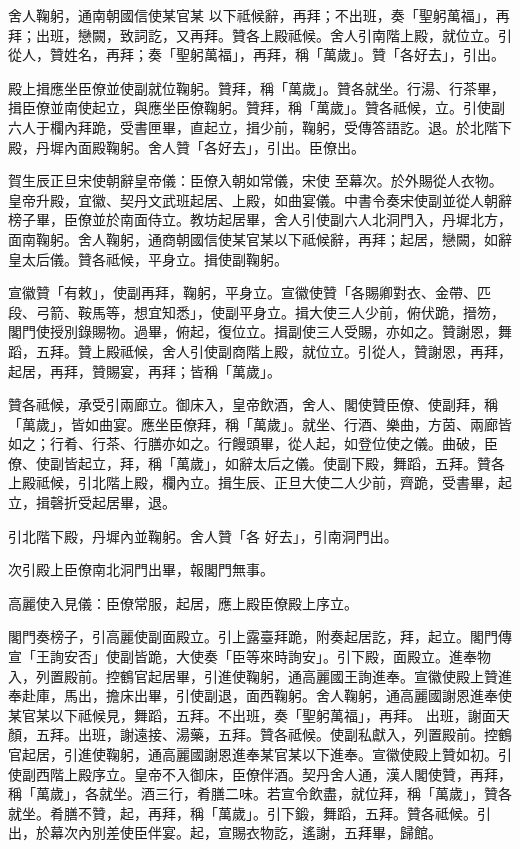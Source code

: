 \begin{pinyinscope}
 舍人鞠躬，通南朝國信使某官某
 以下祗候辭，再拜；不出班，奏「聖躬萬福」，再拜；出班，戀闕，致詞訖，又再拜。贊各上殿祗候。舍人引南階上殿，就位立。引從人，贊姓名，再拜；奏「聖躬萬福」，再拜，稱「萬歲」。贊「各好去」，引出。



 殿上揖應坐臣僚並使副就位鞠躬。贊拜，稱「萬歲」。贊各就坐。行湯、行茶畢，揖臣僚並南使起立，與應坐臣僚鞠躬。贊拜，稱「萬歲」。贊各祗候，立。引使副六人于欄內拜跪，受書匣畢，直起立，揖少前，鞠躬，受傳答語訖。退。於北階下殿，丹墀內面殿鞠躬。舍人贊「各好去」，引出。臣僚出。



 賀生辰正旦宋使朝辭皇帝儀：臣僚入朝如常儀，宋使
 至幕次。於外賜從人衣物。皇帝升殿，宜徽、契丹文武班起居、上殿，如曲宴儀。中書令奏宋使副並從人朝辭榜子畢，臣僚並於南面侍立。教坊起居畢，舍人引使副六人北洞門入，丹墀北方，面南鞠躬。舍人鞠躬，通商朝國信使某官某以下祗候辭，再拜；起居，戀闕，如辭皇太后儀。贊各祗候，平身立。揖使副鞠躬。



 宣徽贊「有敕」，使副再拜，鞠躬，平身立。宣徽使贊「各賜卿對衣、金帶、匹段、弓箭、鞍馬等，想宜知悉」，使副平身立。揖大使三人少前，俯伏跪，搢笏，閣門使授別錄賜物。過畢，俯起，復位立。揖副使三人受賜，亦如之。贊謝恩，舞
 蹈，五拜。贊上殿祗候，舍人引使副商階上殿，就位立。引從人，贊謝恩，再拜，起居，再拜，贊賜宴，再拜；皆稱「萬歲」。



 贊各祗候，承受引兩廊立。御床入，皇帝飲酒，舍人、閣使贊臣僚、使副拜，稱「萬歲」，皆如曲宴。應坐臣僚拜，稱「萬歲」。就坐、行酒、樂曲，方茵、兩廊皆如之；行肴、行茶、行膳亦如之。行饅頭畢，從人起，如登位使之儀。曲破，臣僚、使副皆起立，拜，稱「萬歲」，如辭太后之儀。使副下殿，舞蹈，五拜。贊各上殿祗候，引北階上殿，欄內立。揖生辰、正旦大使二人少前，齊跪，受書畢，起立，揖磬折受起居畢，退。



 引北階下殿，丹墀內並鞠躬。舍人贊「各
 好去」，引南洞門出。



 次引殿上臣僚南北洞門出畢，報閣門無事。



 高麗使入見儀：臣僚常服，起居，應上殿臣僚殿上序立。



 閣門奏榜子，引高麗使副面殿立。引上露臺拜跪，附奏起居訖，拜，起立。閣門傳宣「王詢安否」使副皆跪，大使奏「臣等來時詢安」。引下殿，面殿立。進奉物入，列置殿前。控鶴官起居畢，引進使鞠躬，通高麗國王詢進奉。宣徽使殿上贊進奉赴庫，馬出，擔床出畢，引使副退，面西鞠躬。舍人鞠躬，通高麗國謝恩進奉使某官某以下祗候見，舞蹈，五拜。不出班，奏「聖躬萬福」，再拜。
 出班，謝面天顏，五拜。出班，謝遠接、湯藥，五拜。贊各祗候。使副私獻入，列置殿前。控鶴官起居，引進使鞠躬，通高麗國謝恩進奉某官某以下進奉。宣徽使殿上贊如初。引使副西階上殿序立。皇帝不入御床，臣僚伴酒。契丹舍人通，漢人閣使贊，再拜，稱「萬歲」，各就坐。酒三行，肴膳二味。若宣令飲盡，就位拜，稱「萬歲」，贊各就坐。肴膳不贊，起，再拜，稱「萬歲」。引下鍛，舞蹈，五拜。贊各祗候。引出，於幕次內別差使臣伴宴。起，宣賜衣物訖，遙謝，五拜畢，歸館。




\end{pinyinscope}

